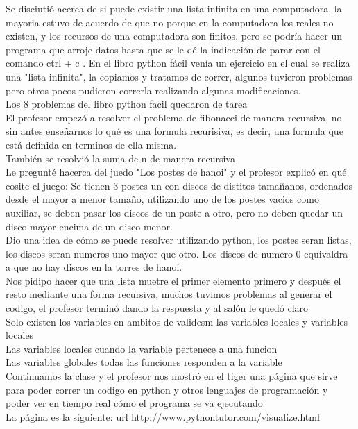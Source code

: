 \documentclass{book}
\begin{document}
Se disciutió acerca de si puede existir una lista infinita en una computadora, la mayoria estuvo de acuerdo de que no porque en la computadora los reales no existen, y los recursos de una computadora son finitos, pero se podría hacer un programa que arroje datos hasta que se le dé la indicación de parar con el comando \color{blue}ctrl + c \color{black}. En el libro python fácil venía un ejercicio en el cual se realiza una "lista infinita", la copiamos y tratamos de correr, algunos tuvieron problemas pero otros pocos pudieron correrla realizando algunas modificaciones.\\
Los 8 problemas del libro python facil quedaron de tarea\\
El profesor empezó a resolver el problema de fibonacci de manera recursiva, no sin antes enseñarnos lo qué es una formula recurisiva, es decir, una formula que está definida en terminos de ella misma.\\
También se resolvió la suma de n de manera recursiva \\
Le pregunté hacerca del juedo "Los postes de hanoi" y el profesor explicó en qué cosite el juego: Se tienen 3 postes un con discos de distitos tamañanos, ordenados desde el mayor a menor tamaño, utilizando uno de los postes vacios como auxiliar, se deben pasar los discos de un poste a otro, pero no deben quedar un disco mayor encima de un disco menor. \\
Dio una idea de cómo se puede resolver utilizando python, los postes seran listas, los discos seran numeros uno mayor que otro. Los discos de numero 0 equivaldra a que no hay discos en la torres de hanoi.\\
Nos pidipo hacer que una lista muetre el primer elemento primero y después el resto mediante una forma recursiva, muchos tuvimos problemas al generar el codigo, el profesor terminó dando la respuesta y al salón le quedó claro\\

Solo existen los variables en ambitos de validesm las variables locales y variables locales\\
Las variables locales cuando la variable pertenece a una funcion\\
Las variables globales todas las funciones responden a la variable\\
Continuamos la clase y el profesor nos mostró en el tiger una página que sirve para poder correr un codigo en python  y otros lenguajes de programación y poder ver en tiempo real cómo el programa se va ejecutando\\
La página es la siguiente: url http://www.pythontutor.com/visualize.html
\end{document}
